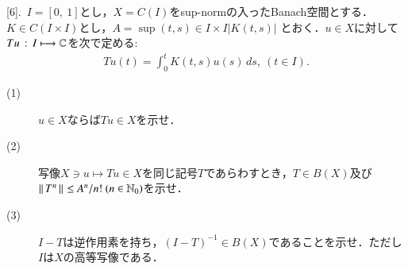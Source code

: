 [6].\ $I=[0,\ 1]$とし，$X=C(I)$をsup-normの入ったBanach空間とする．$K \in C(I \times I)$とし，$A = \sup{(t,s)\in I \times I}{|K(t,s)|}$
とおく．$u \in X$に対して$Tu\, :\, I \longmapsto \mathbb{C}$を次で定める:
\begin{align}
	Tu(t) = \int_{0}^{t} K(t,s)u(s)\, ds,\ (t \in I).
\end{align}
\begin{description}
	\item[(1)] $u \in X$ならば$Tu \in X$を示せ．
	\item[(2)] 写像$X \ni u \longmapsto Tu \in X$を同じ記号$T$であらわすとき，$T \in B(X)$及び$\left\|\, T^n\, \right\|_{} \leq A^n/n!\ (n \in \mathbb{N}_0)$を示せ．
	\item[(3)] $I-T$は逆作用素を持ち，$(I-T)^{-1} \in B(X)$であることを示せ．ただし$I$は$X$の高等写像である．
\end{description}

